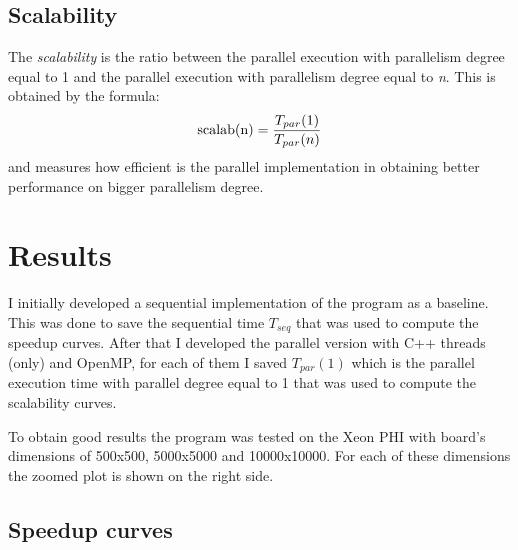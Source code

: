 \documentclass[a4paper,10pt]{article}
\begin{document}
\subsection{Scalability}
The \textit{scalability} is the ratio between the parallel execution with parallelism degree equal to 1 and the parallel execution with parallelism degree equal to \textit{n}. This is obtained by the formula:
\begin{equation}
\textnormal{scalab(n)} = \frac{T_{par}(1)}{T_{par}(n)}
\end{equation}
and measures how efficient is the parallel implementation in obtaining better performance on bigger parallelism degree.
\section{Results}
I initially developed a sequential implementation of the program as a baseline. This was done to save the sequential time $T_{seq}$ that was used to compute the speedup curves. After that I developed the parallel version with C++ threads (only) and OpenMP, for each of them I saved $T_{par}(1)$ which is the parallel execution time with parallel degree equal to 1 that was used to compute the scalability curves. 

To obtain good results the program was tested on the Xeon PHI with board's dimensions of 500x500, 5000x5000 and 10000x10000. For each of these dimensions the zoomed plot is shown on the right side. 



\subsection{Speedup curves}
\end{document}
